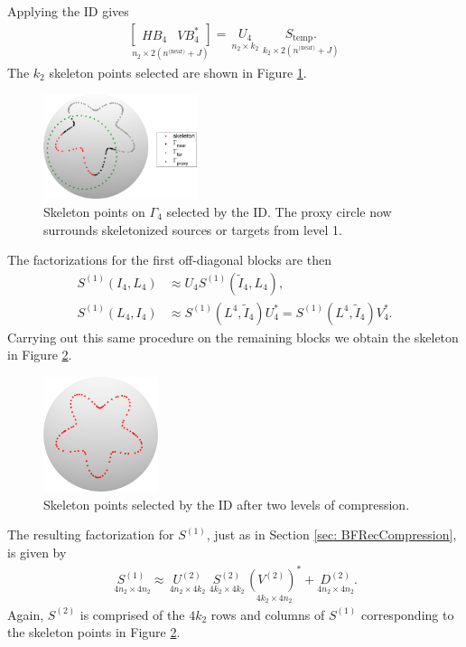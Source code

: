 \documentclass{sfuthesis}
\begin{document}
Applying the ID gives
\begin{align*}
	\underset{n_2 \times 2(n^{\text{(near)}}+J)}{\left[\begin{array}{cc}
	HB_4 & VB^*_4\end{array}\right]}=\underset{ \ n_2 \times k_2 \ }{U_4} \underset{ \ k_2 \times 2(n^{\text{(near)}}+J) \ }{S_{\text{temp}}.}
\end{align*}
The $k_2$ skeleton points selected are shown in Figure \ref{fig: ProxyRecLev2Block4}. 
\begin{figure}[h]
	\centering
  	\includegraphics[width=0.4\textwidth]{ProxyRecLev2Block4}
 	\caption{Skeleton points on $\Gamma_4$ selected by the ID. The proxy circle now surrounds skeletonized sources or targets from level 1. }
	\label{fig: ProxyRecLev2Block4}
\end{figure}

The factorizations for the first off-diagonal blocks are then 
\begin{align*}
	S^{(1)}(I_4, L_4)& \approx U_4S^{(1)}(\tilde{I}_4, L_4),\\
	S^{(1)}(L_4, I_4)& \approx S^{(1)}(L^4, \tilde{I}_4)U_4^*=S^{(1)}(L^4, \tilde{I}_4)V_4^*.
\end{align*}
Carrying out this same procedure on the remaining blocks we obtain the skeleton in Figure \ref{fig: ProxyRecLev2SkelAll}. 
\begin{figure}[h]
	\centering
	\includegraphics[width=0.3\textwidth]{ProxyRecLev2SkelAll}
	\caption{Skeleton points selected by the ID after two levels of compression. }
	\label{fig: ProxyRecLev2SkelAll}
\end{figure}
The resulting factorization for $S^{(1)}$, just as in Section \ref{sec: BFRecCompression}, is given by
\begin{align*}
	\underset{ \ 4n_2 \times 4n_2}{S^{(1)}} \approx \underset{ \ 4n_2 \times 4k_2 \ }{U^{(2)}}\underset{ \ 4k_2 \times 4k_2 \ } {S^{(2)}} \underset{ \ 4k_2 \times 4n_2 \ } {{(V^{(2)})}^*}+ \underset{4n_2 \times 4n_2}{D^{(2)}}.
\end{align*}
Again, $S^{(2)}$ is comprised of the $4k_2$ rows and columns of $S^{(1)}$ corresponding to the skeleton points in Figure \ref{fig: ProxyRecLev2SkelAll}.
\end{document}
